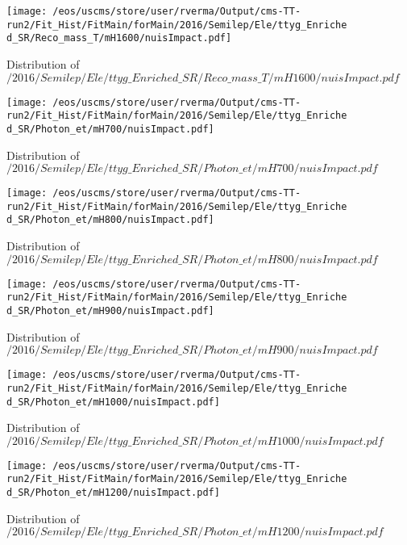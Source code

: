 \begin{figure}
\centering
\texttt{[image: /eos/uscms/store/user/rverma/Output/cms-TT-run2/Fit\_Hist/FitMain/forMain/2016/Semilep/Ele/ttyg\_Enriched\_SR/Reco\_mass\_T/mH1600/nuisImpact.pdf]}
\caption{Distribution of $/2016/Semilep/Ele/ttyg\_Enriched\_SR/Reco\_mass\_T/mH1600/nuisImpact.pdf$}
\end{figure}

\begin{figure}
\centering
\texttt{[image: /eos/uscms/store/user/rverma/Output/cms-TT-run2/Fit\_Hist/FitMain/forMain/2016/Semilep/Ele/ttyg\_Enriched\_SR/Photon\_et/mH700/nuisImpact.pdf]}
\caption{Distribution of $/2016/Semilep/Ele/ttyg\_Enriched\_SR/Photon\_et/mH700/nuisImpact.pdf$}
\end{figure}

\begin{figure}
\centering
\texttt{[image: /eos/uscms/store/user/rverma/Output/cms-TT-run2/Fit\_Hist/FitMain/forMain/2016/Semilep/Ele/ttyg\_Enriched\_SR/Photon\_et/mH800/nuisImpact.pdf]}
\caption{Distribution of $/2016/Semilep/Ele/ttyg\_Enriched\_SR/Photon\_et/mH800/nuisImpact.pdf$}
\end{figure}

\begin{figure}
\centering
\texttt{[image: /eos/uscms/store/user/rverma/Output/cms-TT-run2/Fit\_Hist/FitMain/forMain/2016/Semilep/Ele/ttyg\_Enriched\_SR/Photon\_et/mH900/nuisImpact.pdf]}
\caption{Distribution of $/2016/Semilep/Ele/ttyg\_Enriched\_SR/Photon\_et/mH900/nuisImpact.pdf$}
\end{figure}

\begin{figure}
\centering
\texttt{[image: /eos/uscms/store/user/rverma/Output/cms-TT-run2/Fit\_Hist/FitMain/forMain/2016/Semilep/Ele/ttyg\_Enriched\_SR/Photon\_et/mH1000/nuisImpact.pdf]}
\caption{Distribution of $/2016/Semilep/Ele/ttyg\_Enriched\_SR/Photon\_et/mH1000/nuisImpact.pdf$}
\end{figure}

\begin{figure}
\centering
\texttt{[image: /eos/uscms/store/user/rverma/Output/cms-TT-run2/Fit\_Hist/FitMain/forMain/2016/Semilep/Ele/ttyg\_Enriched\_SR/Photon\_et/mH1200/nuisImpact.pdf]}
\caption{Distribution of $/2016/Semilep/Ele/ttyg\_Enriched\_SR/Photon\_et/mH1200/nuisImpact.pdf$}
\end{figure}

